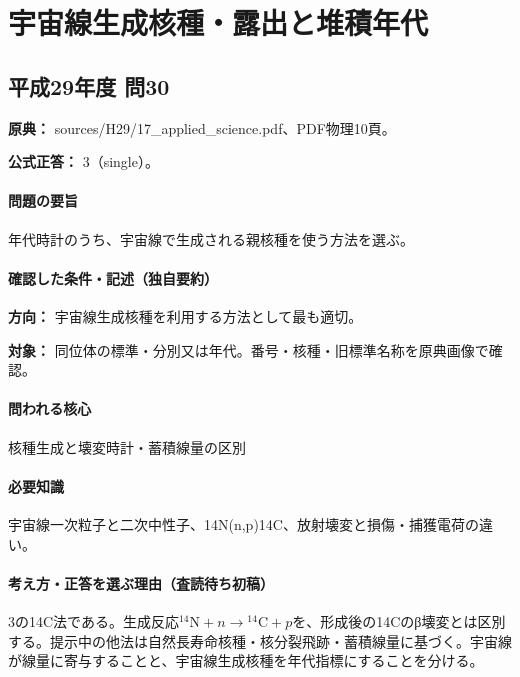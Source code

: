\section{宇宙線生成核種・露出と堆積年代}

\subsection{平成29年度 問30}
\label{q:h29-reg-applied-30}

\noindent\textbf{原典：} sources/H29/17\_applied\_science.pdf、PDF物理10頁。

\textbf{公式正答：} 3（single）。

\paragraph{問題の要旨} 年代時計のうち、宇宙線で生成される親核種を使う方法を選ぶ。

\paragraph{確認した条件・記述（独自要約）}\mbox{}\par

\noindent\textbf{方向：} 宇宙線生成核種を利用する方法として最も適切。\par

\noindent\textbf{対象：} 同位体の標準・分別又は年代。番号・核種・旧標準名称を原典画像で確認。\par

\paragraph{問われる核心} 核種生成と壊変時計・蓄積線量の区別

\paragraph{必要知識} 宇宙線一次粒子と二次中性子、14N(n,p)14C、放射壊変と損傷・捕獲電荷の違い。

\paragraph{考え方・正答を選ぶ理由（査読待ち初稿）} 3の14C法である。生成反応\({}^{14}\mathrm N+n\to{}^{14}\mathrm C+p\)を、形成後の14Cのβ壊変とは区別する。提示中の他法は自然長寿命核種・核分裂飛跡・蓄積線量に基づく。宇宙線が線量に寄与することと、宇宙線生成核種を年代指標にすることを分ける。

